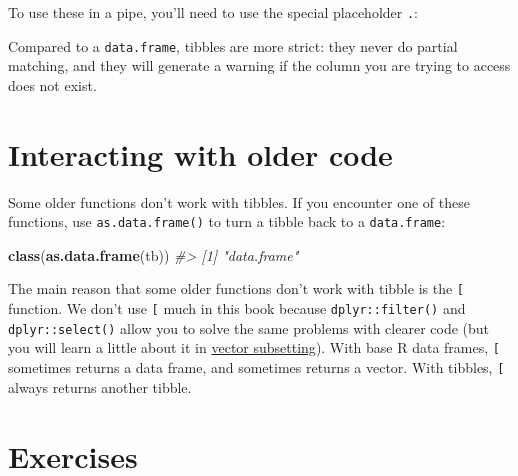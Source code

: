 \documentclass[]{book}
\newenvironment{Shaded}{\begin{snugshade}}{\end{snugshade}}
\newcommand{\KeywordTok}[1]{\textcolor[rgb]{0.13,0.29,0.53}{\textbf{{#1}}}}
\newcommand{\StringTok}[1]{\textcolor[rgb]{0.31,0.60,0.02}{{#1}}}
\newcommand{\CommentTok}[1]{\textcolor[rgb]{0.56,0.35,0.01}{\textit{{#1}}}}
\newcommand{\NormalTok}[1]{{#1}}
\begin{document}
To use these in a pipe, you'll need to use the special placeholder
\texttt{.}:

\begin{Shaded}
\end{Shaded}

Compared to a \texttt{data.frame}, tibbles are more strict: they never
do partial matching, and they will generate a warning if the column you
are trying to access does not exist.

\section{Interacting with older code}\label{interacting-with-older-code}

Some older functions don't work with tibbles. If you encounter one of
these functions, use \texttt{as.data.frame()} to turn a tibble back to a
\texttt{data.frame}:

\begin{Shaded}
\begin{Highlighting}[]
\KeywordTok{class}\NormalTok{(}\KeywordTok{as.data.frame}\NormalTok{(tb))}
\CommentTok{#> [1] "data.frame"}
\end{Highlighting}
\end{Shaded}

The main reason that some older functions don't work with tibble is the
\texttt{{[}} function. We don't use \texttt{{[}} much in this book
because \texttt{dplyr::filter()} and \texttt{dplyr::select()} allow you
to solve the same problems with clearer code (but you will learn a
little about it in \protect\hyperlink{vector-subsetting}{vector
subsetting}). With base R data frames, \texttt{{[}} sometimes returns a
data frame, and sometimes returns a vector. With tibbles, \texttt{{[}}
always returns another tibble.

\section{Exercises}\label{exercises-18}
\end{document}
